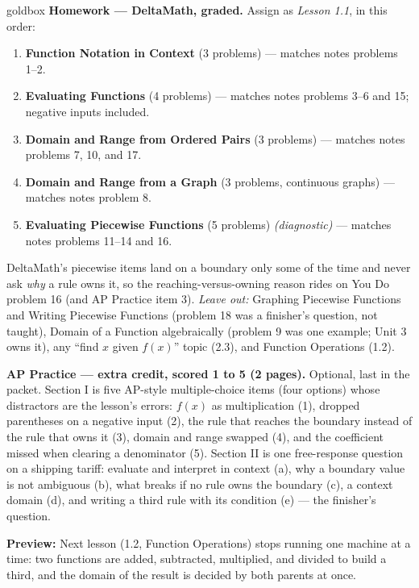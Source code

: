 \documentclass[10pt]{article}
\begin{document}
\begin{skillbox}{goldbox}
\textbf{Homework --- DeltaMath, graded.} Assign as \textit{Lesson 1.1}, in this order:
\begin{enumerate}[itemsep=1pt,topsep=2pt]
  \item \textbf{Function Notation in Context} (3 problems) --- matches notes
        problems 1--2.
  \item \textbf{Evaluating Functions} (4 problems) --- matches notes problems 3--6
        and 15; negative inputs included.
  \item \textbf{Domain and Range from Ordered Pairs} (3 problems) --- matches notes
        problems 7, 10, and 17.
  \item \textbf{Domain and Range from a Graph} (3 problems, continuous graphs) ---
        matches notes problem 8.
  \item \textbf{Evaluating Piecewise Functions} (5 problems) \textit{(diagnostic)}
        --- matches notes problems 11--14 and 16.
\end{enumerate}
DeltaMath's piecewise items land on a boundary only some of the time and never ask
\emph{why} a rule owns it, so the reaching-versus-owning reason rides on You Do
problem 16 (and AP Practice item 3).
\textit{Leave out:} Graphing Piecewise Functions and Writing Piecewise Functions
(problem 18 was a finisher's question, not taught), Domain of a Function
algebraically (problem 9 was one example; Unit 3 owns it), any ``find $x$ given
$f(x)$'' topic (2.3), and Function Operations (1.2).

\textbf{AP Practice --- extra credit, scored 1 to 5 (2 pages).} Optional, last in the packet.
Section I is five AP-style multiple-choice items (four options) whose
distractors are the lesson's errors: $f(x)$ as multiplication (1), dropped
parentheses on a negative input (2), the rule that reaches the boundary instead of
the rule that owns it (3), domain and range swapped (4), and the coefficient missed
when clearing a denominator (5). Section II is one free-response question on a
shipping tariff: evaluate and interpret in context (a), why a boundary value is not
ambiguous (b), what breaks if no rule owns the boundary (c), a context domain (d),
and writing a third rule with its condition (e) --- the finisher's question.

\textbf{Preview:} Next lesson (1.2, Function Operations) stops running one machine
at a time: two functions are added, subtracted, multiplied, and divided to build a
third, and the domain of the result is decided by both parents at once.
\end{skillbox}
\end{document}
